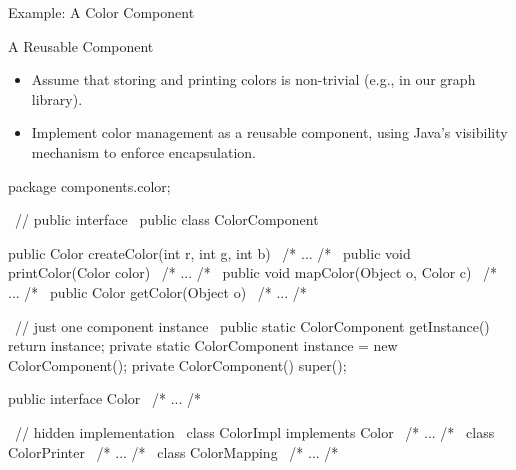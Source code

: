 \begin{frame}[fragile]{Example: A Color Component \mytitlesource{\fospl}}
	\begin{mycolumns}[columns=2,widths={40,60}]
			\begin{example}{A Reusable Component}
				\begin{itemize}
					\item Assume that storing and printing colors is non-trivial (e.g., in our graph library). 
					\item Implement color management as a reusable component, using Java's visibility mechanism to enforce encapsulation.						
				\end{itemize}
			\end{example}
		\mynextcolumn
\begin{codetight}{}
package components.color;

~// public interface~
public class ColorComponent {
	public Color createColor(int r, int g, int b) { ~/* ... /*~ }
	public void printColor(Color color) { ~/* ... /*~ }
	public void mapColor(Object o, Color c) { ~/* ... /*~ }
	public Color getColor(Object o) { ~/* ... /*~ }
	
	~// just one component instance~
	public static ColorComponent getInstance() { return instance; }
	private static ColorComponent instance = new ColorComponent();
	private ColorComponent() { super(); }
}
public interface Color { ~/* ... /*~ }

~// hidden implementation~
class ColorImpl implements Color { ~/* ... /*~ }
class ColorPrinter { ~/* ... /*~ }
class ColorMapping { ~/* ... /*~ }
\end{codetight} %
	\end{mycolumns}
\end{frame}

